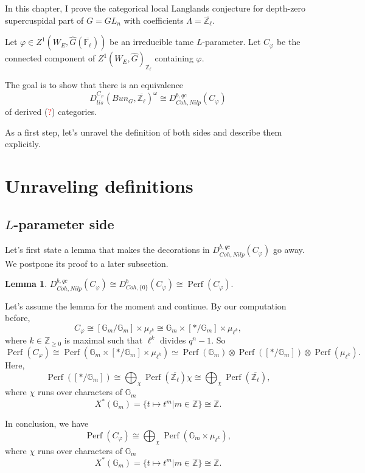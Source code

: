\documentclass{article}
\newcommand{\red}[1]{\textcolor{red}{#1}}
\newtheorem{lemma}{Lemma}
\newcommand{\Perf}{\operatorname{Perf}}
\begin{document}
In this chapter, I prove the categorical local Langlands conjecture for depth-zero supercuspidal part of $G=GL_n$ with coefficients $\Lambda=\overline{\mathbb{Z}_{\ell}}$.

Let $\varphi \in Z^1(W_E, \hat{G}(\overline{\mathbb{F}_{\ell}}))$ be an irreducible tame $L$-parameter. Let $C_{\varphi}$ be the connected component of $Z^1(W_E, \hat{G})_{\overline{\mathbb{Z}_{\ell}}}$ containing $\varphi$. 

The goal is to show that there is an equivalence
$$D_{lis}^{C_{\varphi}}(Bun_G, \overline{\mathbb{Z}_{\ell}})^{\omega} \cong D^{b, qc}_{Coh, Nilp}(C_{\varphi})$$
of derived (\red{?}) categories.

As a first step, let's unravel the definition of both sides and describe them explicitly.

\section{Unraveling definitions}

\subsection{$L$-parameter side}

Let's first state a lemma that makes the decorations in $D^{b, qc}_{Coh, Nilp}(C_{\varphi})$ go away. We postpone its proof to a later subsection.

\begin{lemma} \label{Lemma 1}
	$D^{b, qc}_{Coh, Nilp}(C_{\varphi}) \cong D^b_{Coh, \{0\}}(C_{\varphi}) \cong \Perf(C_{\varphi}).$
\end{lemma} 
	
Let's assume the lemma for the moment and continue. By our computation before,
$$C_{\varphi} \cong [\mathbb{G}_m/\mathbb{G}_m] \times \mu_{\ell^k} \cong \mathbb{G}_m \times [*/\mathbb{G}_m] \times \mu_{\ell^k},$$
where $k \in \mathbb{Z}_{\geq 0}$ is maximal such that $\ell^k$ divides $q^n-1$. So
$$\Perf(C_{\varphi}) \cong \Perf(\mathbb{G}_m \times [*/\mathbb{G}_m] \times \mu_{\ell^k}) \simeq \Perf(\mathbb{G}_m) \otimes \Perf([*/\mathbb{G}_m]) \otimes \Perf(\mu_{\ell^k}).$$
Here,
$$\Perf([*/\mathbb{G}_m]) \cong \bigoplus_{\chi}\Perf(\overline{\mathbb{Z}_{\ell}})\chi \cong \bigoplus_{\chi}\Perf(\overline{\mathbb{Z}_{\ell}}),$$
where $\chi$ runs over characters of $\mathbb{G}_m$ 
$$X^*(\mathbb{G}_m)=\{t \mapsto t^m | m \in \mathbb{Z}\} \cong \mathbb{Z}.$$

In conclusion, we have 
$$\Perf(C_{\varphi}) \cong \bigoplus_{\chi}\Perf(\mathbb{G}_m \times \mu_{\ell^k}),$$
where $\chi$ runs over characters of $\mathbb{G}_m$ 
$$X^*(\mathbb{G}_m)=\{t \mapsto t^m | m \in \mathbb{Z}\} \cong \mathbb{Z}.$$
\end{document}
